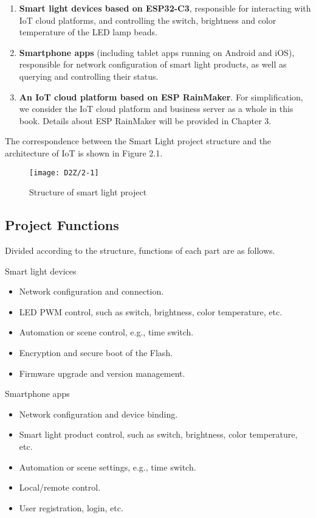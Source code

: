 \documentclass[a4paper,12pt]{book}
\begin{document}
\begin{enumerate}[label=\roman*.]
    \item \textbf{Smart light devices based on ESP32-C3}, responsible for interacting with IoT cloud platforms, and controlling the switch, brightness and color temperature of the LED lamp beads.
    \item \textbf{Smartphone apps} (including tablet apps running on Android and iOS), responsible for network configuration of smart light products, as well as querying and controlling their status.
    \item \textbf{An IoT cloud platform based on ESP RainMaker}. For simplification, we consider the IoT cloud platform and business server as a whole in this book. Details about ESP RainMaker will be provided in Chapter 3.
\end{enumerate}

The correspondence between the Smart Light project structure and the architecture of IoT is shown in Figure 2.1.

\begin{figure}[!ht]
    \centering
    \texttt{[image: D2Z/2-1]}
    \caption{Structure of smart light project}
\end{figure}

\subsection{Project Functions}
Divided according to the structure, functions of each part are as follows.

\begin{term}{Smart light devices}
    \begin{itemize}
        \item Network configuration and connection.
        \item LED PWM control, such as switch, brightness, color temperature, etc.
        \item Automation or scene control, e.g., time switch.
        \item Encryption and secure boot of the Flash.
        \item Firmware upgrade and version management.
    \end{itemize}
\end{term}

\begin{term}{Smartphone apps}
    \begin{itemize}
        \item Network configuration and device binding.
        \item Smart light product control, such as switch, brightness, color temperature, etc.
        \item Automation or scene settings, e.g., time switch.
        \item Local/remote control.
        \item User registration, login, etc.
    \end{itemize}
\end{term}
\end{document}
